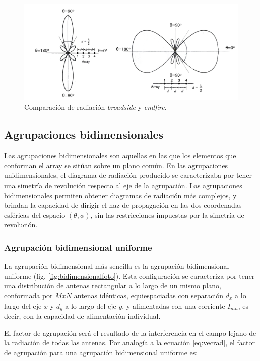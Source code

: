 \begin{figure}[h]
    \centering
        \includegraphics[width=\textwidth]{archivos/array/side}
        \caption{Comparación de radiación \textit{broadside} y \textit{endfire}.}
        \label{fig:side}
\end{figure}

\subsection{Agrupaciones bidimensionales}
\par Las agrupaciones bidimensionales son aquellas en las que los elementos que conforman el array se sitúan sobre un plano común. En las agrupaciones unidimensionales, el diagrama de radiación producido se caracterizaba por tener una simetría de revolución respecto al eje de la agrupación. Las agrupaciones bidimensionales permiten obtener diagramas de radiación más complejos, y brindan la capacidad de dirigir el haz de propagación en las dos coordenadas esféricas del espacio $(\theta, \phi)$, sin las restricciones impuestas por la simetría de revolución. \cite{Cardama2002}
\\
\subsubsection{Agrupación bidimensional uniforme}
\par La agrupación bidimensional más sencilla es la agrupación bidimensional uniforme (fig. \ref{fig:bidimensionalfoto}). Esta configuración se caracteriza por tener una distribución de antenas rectangular a lo largo de un mismo plano, conformada por $MxN$ antenas idénticas, equiespaciadas con separación $d_{x}$ a lo largo del eje $x$ y $d_{y}$ a lo largo del eje $y$, y alimentadas con una corriente $I_{mn}$, es decir, con la capacidad de alimentación individual. \cite{Cardama2002}
\\
\par El factor de agrupación será el resultado de la interferencia en el campo lejano de la radiación de todas las antenas. Por analogía a la ecuación \ref{eq:vecrad}, el factor de agrupación para una agrupación bidimensional uniforme es: \cite{Cardama2002}

